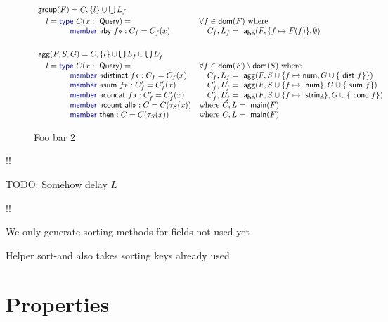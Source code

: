 \documentclass[a4paper,UKenglish]{lipics-v2016}
\theoremstyle{plain}
\theoremstyle{definition}
\newcommand{\kvd}[1]{\textnormal{\textcolor{kvdclr}{\sffamily #1}}}
\newcommand{\ident}[1]{\textnormal{\sffamily #1}}
\newcommand{\qident}[1]{\textnormal{\sffamily \guillemotleft #1\guillemotright}}
\newcommand{\dom}{\ident{dom}}
\begin{document}
\begin{figure}
\begin{equation*}
\begin{array}{ll}
\ident{group}(F) = C, \{l\} \cup \bigcup L_f \\[0.25em]
\quad l = \kvd{type}~C(x:\ident{Query}) = &\forall f\in\dom(F)~\textnormal{where} \\
\qquad \qquad \kvd{member}~\qident{by $f$} : C_f = C_f(x) &\quad C_f, L_f = \ident{agg}(F, \{ f \mapsto F(f) \}, \emptyset)\\
\\[0.5em]
\ident{agg}(F,S,G) = C, \{l\} \cup \bigcup L_f \cup \bigcup L'_f\\[0.25em]
\quad l = \kvd{type}~C(x:\ident{Query}) = &\forall f\in\dom(F)\setminus\dom(S)~\textnormal{where} \\
\qquad \qquad \kvd{member}~\qident{distinct $f$} : C_f = C_f(x) &\quad C_f, L_f = \ident{agg}(F, S\cup\{ f \mapsto \ident{num}, G\cup\{\ident{dist}~f\} \})\\
\qquad \qquad \kvd{member}~\qident{sum $f$} : C'_f = C'_f(x) &\quad C'_f, L'_f = \ident{agg}(F, S\cup\{ f \mapsto \ident{num} \}, G\cup\{\ident{sum}~f\})\\
\qquad \qquad \kvd{member}~\qident{concat $f$} : C'_f = C'_f(x) &\quad C'_f, L'_f = \ident{agg}(F, S\cup\{ f \mapsto \ident{string} \}, G\cup\{\ident{conc}~f\})\\
\qquad \qquad \kvd{member}~\qident{count all} : C = C(\tau_S(x))                 &\textnormal{where}~C, L = \ident{main}(F)\\
\qquad \qquad \kvd{member}~\ident{then} : C = C(\tau_S(x))                 &\textnormal{where}~C, L = \ident{main}(F)\\
\end{array}
\end{equation*}
\caption{Foo bar 2}
\label{fig:foobar2}
\end{figure}


!!

TODO: Somehow delay $L$

!!

We only generate sorting methods for fields not used yet

Helper \ident{sort-and} also takes sorting keys already used

\section{Properties}
\label{sec:proofs}
\end{document}
